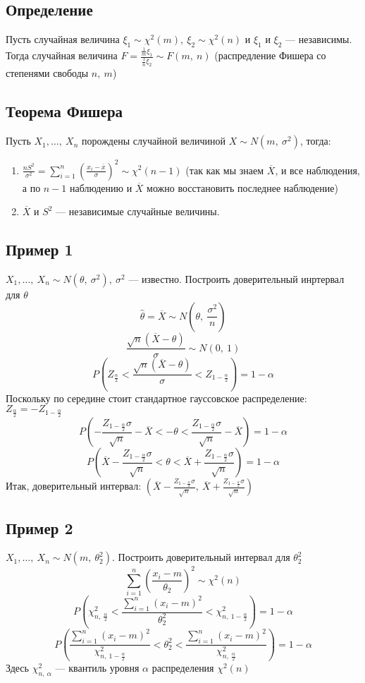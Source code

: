 \documentclass[12pt, a4paper]{article}
\newcommand{\sion}{\sum\limits_{i = 1}^{n}}
\begin{document}
\subsection*{Определение}
Пусть случайная величина $\xi_1 \sim \chi^2(m),\ \xi_2 \sim \chi^2(n)$ и $\xi_1$ и $\xi_2$ --- независимы. Тогда случайная величина $F = \frac{\frac{1}{m} \xi_1}{\frac{1}{n} \xi_2} \sim F(m,\ n)$ (распредление Фишера со степенями свободы $n,\ m$)
\subsection*{Теорема Фишера}
Пусть $X_1,\dots,\ X_n$ порождены случайной величиной $X \sim N(m,\ \sigma^2)$, тогда:
\begin{enumerate}
    \item $\frac{nS^2}{\sigma^2} = \sion \left( \frac{x_i - \overline{x}}{\sigma} \right)^2 \sim \chi^2(n - 1)$ (так как мы знаем $\overline{X}$, и все наблюдения, а по $n - 1$ наблюдению и $\overline{X}$ можно восстановить последнее наблюдение)
    \item $\overline{X}$ и $S^2$ --- независимые случайные величины.
\end{enumerate}
\subsection*{Пример 1}
$X_1,\dots,\ X_n \sim N(\theta,\ \sigma^2),\ \sigma^2$ --- известно. Построить доверительный инртервал для $\theta$
\[\hat{\theta} = \overline{X} \sim N(\theta,\ \frac{\sigma^2}{n})\]
\[ \frac{\sqrt{n} (\overline{X} - \theta)}{\sigma} \sim N(0,\ 1) \]
\[P\left( Z_{\frac{\alpha}{2}} < \frac{\sqrt{n} (\overline{X} - \theta)}{\sigma} < Z_{1 - \frac{\alpha}{2}} \right) = 1 - \alpha\]
Поскольку по середине стоит стандартное гауссовское распределение: $Z_{\frac{\alpha}{2}} = -Z_{1 - \frac{\alpha}{2}}$ 
\[P\left( -\frac{Z_{1 - \frac{\alpha}{2}}\sigma}{\sqrt{n}} - \overline{X} < -\theta < \frac{Z_{1 - \frac{\alpha}{2}} \sigma}{\sqrt{n}} - \overline{X} \right) = 1 - \alpha\]
\[P\left( \overline{X} - \frac{Z_{1 - \frac{\alpha}{2}}\sigma}{\sqrt{n}}  < \theta < \overline{X} + \frac{Z_{1 - \frac{\alpha}{2}} \sigma}{\sqrt{n}} \right) = 1 - \alpha\]
Итак, доверительный интервал: $\left( \overline{X} - \frac{Z_{1 - \frac{\alpha}{2}}\sigma}{\sqrt{n}},\ \overline{X} + \frac{Z_{1 - \frac{\alpha}{2}}\sigma}{\sqrt{n}}\right)$
\subsection*{Пример 2}
$X_1,\dots,\ X_n \sim N(m,\ \theta_2^2)$. Построить доверительный интервал для $\theta_2^2$
\[\sum_{i = 1}^n \left( \frac{x_i - m}{\theta_2} \right)^2 \sim \chi^2(n)\]
\[P\left(\chi^2_{n,\ \frac{\alpha}{2}} < \frac{\sion (x_i - m)^2}{\theta_2^2} < \chi^2_{n,\ 1 - \frac{\alpha}{2}}\right) = 1 - \alpha \]
\[P\left( \frac{\sion (x_i - m)^2}{\chi^2_{n,\ 1 - \frac{\alpha}{2}}} < \theta_2^2 < \frac{\sion (x_i - m)^2}{\chi^2_{n,\ \frac{\alpha}{2}}} \right) = 1 - \alpha\]
Здесь $\chi^2_{n,\ \alpha}$ --- квантиль уровня $\alpha$ распределения $\chi^2(n)$
\end{document}
